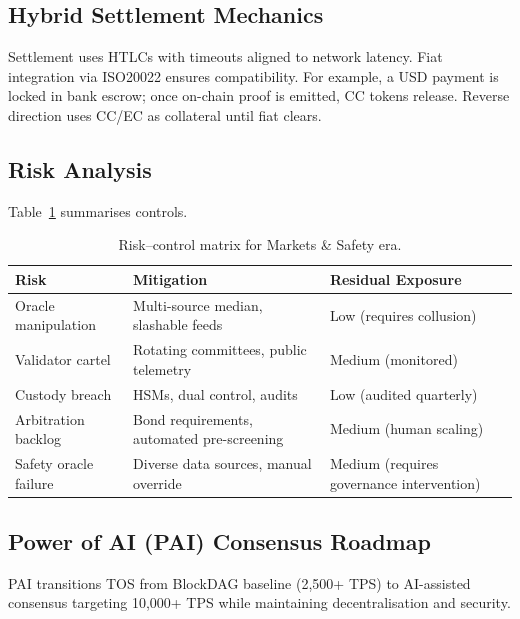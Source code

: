 \documentclass[11pt]{article}
\begin{document}
\subsection{Hybrid Settlement Mechanics}
Settlement uses HTLCs with timeouts aligned to network latency. Fiat integration via ISO20022 ensures compatibility. For example, a USD payment is locked in bank escrow; once on-chain proof is emitted, CC tokens release. Reverse direction uses CC/EC as collateral until fiat clears.

\subsection{Risk Analysis}
Table~\ref{tab:risk-markets} summarises controls.

\begin{table}[H]
  \centering
  \begin{tabular}{p{}p{}p{}}
    \toprule
    \textbf{Risk} & \textbf{Mitigation} & \textbf{Residual Exposure} \\
    \midrule
    Oracle manipulation & Multi-source median, slashable feeds & Low (requires collusion) \\
    Validator cartel & Rotating committees, public telemetry & Medium (monitored) \\
    Custody breach & HSMs, dual control, audits & Low (audited quarterly) \\
    Arbitration backlog & Bond requirements, automated pre-screening & Medium (human scaling) \\
    Safety oracle failure & Diverse data sources, manual override & Medium (requires governance intervention) \\
    \bottomrule
  \end{tabular}
  \caption{Risk--control matrix for Markets \& Safety era.}
  \label{tab:risk-markets}
\end{table}

\subsection{Power of AI (PAI) Consensus Roadmap}
\label{sec:pai-roadmap}
PAI transitions TOS from BlockDAG baseline (2,500+ TPS) to AI-assisted consensus targeting 10,000+ TPS while maintaining decentralisation and security.
\end{document}
